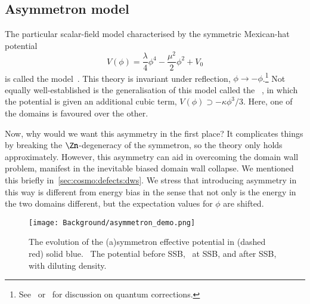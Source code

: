     \subsection{Asymmetron model}\label{sec:cosmo:quintessence:asymmetron}
    The particular scalar-field model characterised by the symmetric Mexican-hat potential
    \begin{equation}
        V(\phi) = \frac{\lambda}{4} \phi^4  - \frac{\mu^2}{2} \phi^2 + V_0
    \end{equation}
    is called the  model~\citep{hinterbichlerSymmetronCosmology2011}. This theory is invariant under reflection, $\phi\to -\phi$.\footnote{
        See~\citet[~11,~12,~20 \&~22]{peskinIntroductionQuantumField1995} or~\citet[~7]{kolbEarlyUniverse1990} for discussion on quantum corrections.
    } %
    Not equally well-established is the generalisation of this model called the ~\citep{perivolaropoulosGravitationalTransitionsExplicitly2022}, in which the potential is given an additional cubic term, $V(\phi)\supset -\kappa\phi^3/3 $. Here, one of the domains is favoured over the other. 

    Now, why would we want this asymmetry in the first place? It complicates things by breaking the $\Zn$-degeneracy of the symmetron, so the theory only holds approximately. However, this asymmetry can aid in overcoming the domain wall problem, manifest in the inevitable biased domain wall collapse. We mentioned this briefly in~\cref{sec:cosmo:defects:dws}. %
    We stress that introducing asymmetry in this way is different from energy bias in the sense that not only is the energy in the two domains different, but the expectation values for $\phi$ are shifted.

    \begin{figure}[h]
        \centering
        {\texttt{[image: Background/asymmetron\_demo.png]}}
        \caption{The evolution of the (a)symmetron effective potential in (dashed red) solid blue. ~The potential before SSB, ~at SSB, and  after SSB, with diluting density.
        }
        \label{fig:cosmo:quintessence:asymmetron_demo}
    \end{figure}

